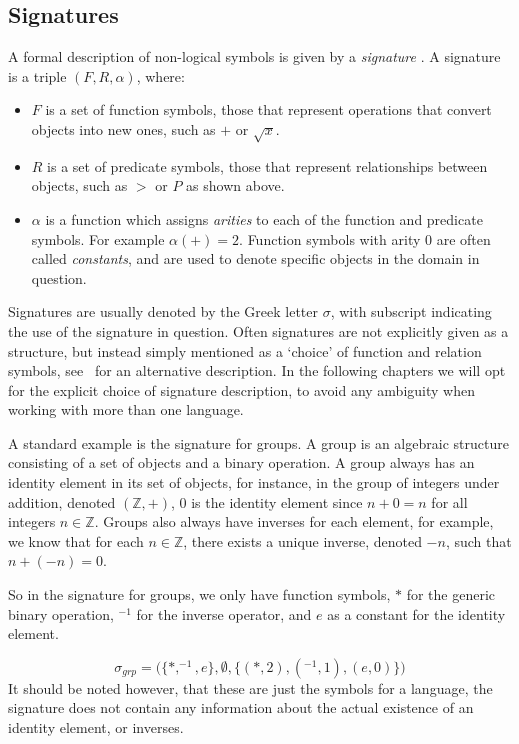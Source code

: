 \documentclass[11pt]{report}
\theoremstyle{definition}
\theoremstyle{theorem}
\theoremstyle{lemma}
\begin{document}
\subsection{Signatures}
A formal description of non-logical symbols is
given by a \emph{signature} \cite[ch. 1.1]{selinger}. A signature is a triple $(F,R,\alpha)$, where:
\begin{itemize}
\item $F$ is a set of function symbols, those that represent operations that convert objects into new ones, such as $+$ or $\sqrt{x}$.
\item $R$ is a set of predicate symbols, those that represent relationships between objects, such as $>$ or $P$ as shown above.
\item $\alpha$ is a function which assigns \emph{arities} to each of the function and predicate symbols.
For example $\alpha(+) = 2$. Function symbols with arity $0$ are often called \emph{constants}, and are used to denote specific objects in the domain in question.
\end{itemize}
Signatures are usually denoted by the Greek letter $\sigma$, with subscript indicating the use of the signature in question.
Often signatures are not explicitly given as a structure, but instead simply mentioned as a `choice' of function and relation symbols, see~\cite{shortermodel} for an alternative description. 
In the following chapters we will opt for the explicit choice of signature description, to avoid any ambiguity when working with more than one language.

A standard example is the signature for groups.
A group is an algebraic structure consisting of a set of objects and a binary operation.
A group always has an identity element in its set of objects, for instance, in the group of integers under addition, denoted $(\mathbb{Z}, +)$, $0$ is the identity element since $n + 0 = n$ for all integers $n\in\mathbb{Z}$.
Groups also always have inverses for each element, for example, we know that for each $n\in\mathbb{Z}$, there exists a unique inverse, denoted $-n$, such that $n + (-n) = 0$.

So in the signature for groups, we only have function symbols, $*$ for the generic binary operation, $^{-1}$ for the inverse operator, and $e$ as a constant for the identity element.

$$\sigma_{\mathit{grp}} = \big(\{*,^{-1}, e\},\emptyset,\{(*, 2), (^{-1}, 1),(e,0)\}\big)$$
It should be noted however, that these are just the symbols for a language, the signature does not contain any information about the actual existence of an identity element, or inverses.
\end{document}
